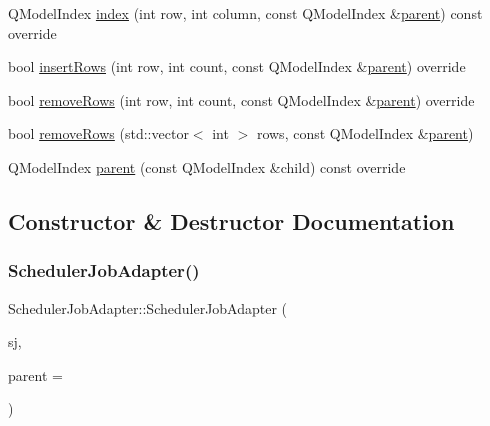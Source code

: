 \begin{DoxyCompactItemize}
\item 
Q\+Model\+Index \mbox{\hyperlink{class_scheduler_job_adapter_a8f6d139992581af9639b7d0e6e418219}{index}} (int row, int column, const Q\+Model\+Index \&\mbox{\hyperlink{class_scheduler_job_adapter_a6b0a7aa25fc5c69078275fea2a0fa5c2}{parent}}) const override
\item 
bool \mbox{\hyperlink{class_scheduler_job_adapter_a47ffe894c52b27d8ce89916f5ac2e9e6}{insert\+Rows}} (int row, int count, const Q\+Model\+Index \&\mbox{\hyperlink{class_scheduler_job_adapter_a6b0a7aa25fc5c69078275fea2a0fa5c2}{parent}}) override
\item 
bool \mbox{\hyperlink{class_scheduler_job_adapter_a35e97746b55b5412f90fd27e4fe991dd}{remove\+Rows}} (int row, int count, const Q\+Model\+Index \&\mbox{\hyperlink{class_scheduler_job_adapter_a6b0a7aa25fc5c69078275fea2a0fa5c2}{parent}}) override
\item 
bool \mbox{\hyperlink{class_scheduler_job_adapter_a5582b5b18f57718c186f01dbdc8fed79}{remove\+Rows}} (std\+::vector$<$ int $>$ rows, const Q\+Model\+Index \&\mbox{\hyperlink{class_scheduler_job_adapter_a6b0a7aa25fc5c69078275fea2a0fa5c2}{parent}})
\item 
Q\+Model\+Index \mbox{\hyperlink{class_scheduler_job_adapter_a6b0a7aa25fc5c69078275fea2a0fa5c2}{parent}} (const Q\+Model\+Index \&child) const override
\end{DoxyCompactItemize}


\subsection{Constructor \& Destructor Documentation}
\mbox{\label{class_scheduler_job_adapter_a7c4dbb5add89d445a8bc986ff6a96c86}} 
\subsubsection{\texorpdfstring{SchedulerJobAdapter()}{SchedulerJobAdapter()}}
{\footnotesize\ttfamily Scheduler\+Job\+Adapter\+::\+Scheduler\+Job\+Adapter (\begin{DoxyParamCaption}\item[{\mbox{\hyperlink{class_scheduler_job}{Scheduler\+Job}} \&}]{sj,  }\item[{Q\+Object $\ast$}]{parent = {} }\end{DoxyParamCaption})\hspace{0.3cm}{\ttfamily [explicit]}}



